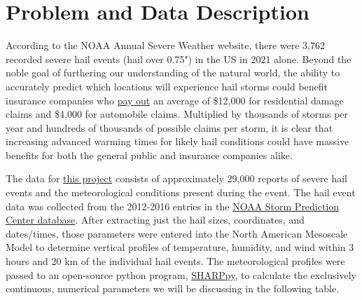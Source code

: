 \documentclass[fleqn,10pt]{SelfArx} %
\affiliation{\textsuperscript{1}\textit{Data Science, School of Informatics , Computing and Engineering, Indiana University, Bloomington, IN, USA}} %
\begin{document}
\flushbottom %

\maketitle %

\tableofcontents %

\thispagestyle{empty} %






\section{Problem and Data Description} %

According to the NOAA Annual Severe Weather website, there were 3,762 recorded severe hail events (hail over 0.75") in the US in 2021 alone. Beyond the noble goal of furthering our understanding of the natural world, the ability to accurately predict which locations will experience hail storms could benefit insurance companies who \href{https://www.insurance.com/coverage/home-hail-damage-insurance-claims#:~:text=hail\%20damage\%20insurance-,Average\%20insurance\%20payout\%20for\%20hail\%20damage,may\%20be\%20higher\%20or\%20lower"}{pay out} an average of \$12,000 for residential damage claims and \$4,000 for automobile claims. Multiplied by thousands of storms per year and hundreds of thousands of possible claims per storm, it is clear that increasing advanced warming times for likely hail conditions could have massive benefits for both the general public and insurance companies alike.

The data for \href{https://github.com/Joshua-Elms/CSCI-B365}{this project} consists of approximately 29,000 reports of severe hail events and the meteorological conditions present during the event. The hail event data was collected from the 2012-2016 entries in the \href{https://www.spc.noaa.gov/wcm/#data}{NOAA Storm Prediction Center database}. After extracting just the hail sizes, coordinates, and dates/times, those parameters were entered into the North American Mesoscale Model to determine vertical profiles of temperature, humidity, and wind within 3 hours and 20 km of the individual hail events. The meteorological profiles were passed to an open-source python program, \href{https://github.com/sharppy/SHARPpy}{SHARPpy}, to calculate the exclusively continuous, numerical parameters we will be discussing in the following table.
\end{document}
